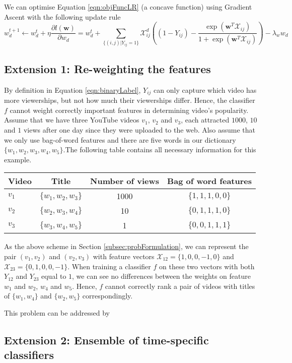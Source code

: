 We can optimise Equation \ref{eqn:objFuncLR} (a concave function) using Gradient Ascent with the following update rule
\begin{equation}
w^{t+1}_d \leftarrow w^t_d + \eta \frac{\partial l(\textbf{w})}{\partial w_d} = w^t_d + \sum_{\{(i,j)|Y_{ij}=1\}} \mathcal{X}_{ij}^d ( (1 - Y_{ij}) - \frac{\exp(\textbf{w}^T\mathcal{X}_{ij})}{1 + \exp(\textbf{w}^T\mathcal{X}_{ij})})  - \lambda_w w_d
\end{equation}

\subsection{Extension 1: Re-weighting the features}
\label{subsec:ext1}
By definition in Equation \ref{eqn:binaryLabel}, $Y_{ij}$ can only capture which video has more viewerships, but not how much their viewerships differ. Hence, the classifier $f$ cannot weight correctly important features in determining video's popularity. Assume that we have three YouTube videos $v_1$, $v_2$ and $v_3$, each attracted $1000$, $10$ and $1$ views after one day since they were uploaded to the web. Also assume that we only use bag-of-word features and there are five words in our dictionary $\{w_1, w_2, w_3, w_4, w_5\}$.The following table contains all necessary information for this example.

	\begin{center}
		\begin{tabular}{| l | c | c | c |}
    			\hline
			Video & Title & Number of views & Bag of word features \\ \hline
			$v_1$ & $\{w_1, w_2, w_3\}$ &	1000 & $\{1, 1, 1, 0 ,0 \}$	\\ \hline
			$v_2$ & $\{w_2, w_3, w_4\}$ & 10 & $\{0, 1, 1, 1 ,0 \}$	\\ \hline
			$v_3$ & $\{w_3, w_4, w_5\}$ & 1 & $\{0, 0, 1, 1 ,1 \}$	\\ \hline
		\end{tabular}
	\end{center}

As the above scheme in Section \ref{subsec:probFormulation}, we can represent the pair $(v_1, v_2)$ and $(v_2, v_3)$ with feature vectors $\mathcal{X}_{12}=\{1, 0, 0, -1, 0\}$ and $\mathcal{X}_{23}=\{0, 1, 0, 0 , -1 \}$. When training a classifier $f$ on these two vectors with both $Y_{12}$ and $Y_{23}$ equal to $1$, we can see no differences between the weights on feature $w_1$ and $w_2$, $w_4$ and $w_5$. Hence, $f$ cannot correctly rank a pair of videos with titles of $\{w_1, w_4\}$ and $\{w_2, w_5\}$ correspondingly.

This problem can be addressed by 

\subsection{Extension 2: Ensemble of time-specific classifiers}
\label{subsec:ext2}



